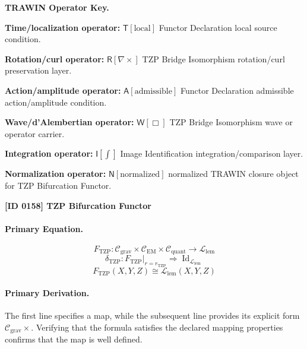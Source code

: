 \par\vspace{0.45\baselineskip}
\noindent\begin{minipage}[t]{\linewidth}
\begingroup
\small
\raggedright
\textbf{TRAWIN Operator Key.}\par
\noindent\textbf{Time/localization operator:} $\mathsf{T}\!\left[\mathrm{local}\right]$ Functor Declaration local source condition.\par
\noindent\textbf{Rotation/curl operator:} $\mathsf{R}\!\left[\nabla\times\right]$ TZP Bridge Isomorphism rotation/curl preservation layer.\par
\noindent\textbf{Action/amplitude operator:} $\mathsf{A}\!\left[\mathrm{admissible}\right]$ Functor Declaration admissible action/amplitude condition.\par
\noindent\textbf{Wave/d'Alembertian operator:} $\mathsf{W}\!\left[\Box\right]$ TZP Bridge Isomorphism wave or operator carrier.\par
\noindent\textbf{Integration operator:} $\mathsf{I}\!\left[\int\right]$ Image Identification integration/comparison layer.\par
\noindent\textbf{Normalization operator:} $\mathsf{N}\!\left[\mathrm{normalized}\right]$ normalized TRAWIN closure object for TZP Bifurcation Functor.\par
\endgroup
\end{minipage}

\clearpage
\noindent\textbf{[ID 0158] TZP Bifurcation Functor}\par
\vspace{0.35em}
\paragraph{Primary Equation.}
\[
F_{\mathrm{TZP}}
:
\mathcal{C}_{\mathrm{grav}}\times
\mathcal{C}_{\mathrm{EM}}\times
\mathcal{C}_{\mathrm{quant}}
\longrightarrow
\mathcal{L}_{\mathrm{lem}}
\]
\[
\delta_{\mathrm{TZP}}
:
F_{\mathrm{TZP}}\big\vert_{r=r_{\mathrm{TZP}}}
\Rightarrow
\operatorname{Id}_{\mathcal{L}_{\mathrm{lem}}}
\]
\[
F_{\mathrm{TZP}}(X,Y,Z)\cong \mathcal{L}_{\mathrm{lem}}(X,Y,Z)
\]

\paragraph{Primary Derivation.}
The first line specifies a map, while the subsequent line provides its explicit form \( \mathcal{C}_{\mathrm{grav}}\times \). Verifying that the formula satisfies the declared mapping properties confirms that the map is well defined.
